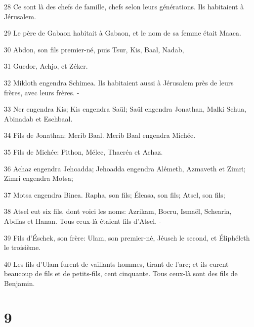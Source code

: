 \par 28 Ce sont là des chefs de famille, chefs selon leurs générations. Ils habitaient à Jérusalem.
\par 29 Le père de Gabaon habitait à Gabaon, et le nom de sa femme était Maaca.
\par 30 Abdon, son fils premier-né, puis Tsur, Kis, Baal, Nadab,
\par 31 Guedor, Achjo, et Zéker.
\par 32 Mikloth engendra Schimea. Ils habitaient aussi à Jérusalem près de leurs frères, avec leurs frères. -
\par 33 Ner engendra Kis; Kis engendra Saül; Saül engendra Jonathan, Malki Schua, Abinadab et Eschbaal.
\par 34 Fils de Jonathan: Merib Baal. Merib Baal engendra Michée.
\par 35 Fils de Michée: Pithon, Mélec, Thaeréa et Achaz.
\par 36 Achaz engendra Jehoadda; Jehoadda engendra Alémeth, Azmaveth et Zimri; Zimri engendra Motsa;
\par 37 Motsa engendra Binea. Rapha, son fils; Éleasa, son fils; Atsel, son fils;
\par 38 Atsel eut six fils, dont voici les noms: Azrikam, Bocru, Ismaël, Schearia, Abdias et Hanan. Tous ceux-là étaient fils d'Atsel. -
\par 39 Fils d'Éschek, son frère: Ulam, son premier-né, Jéusch le second, et Éliphéleth le troisième.
\par 40 Les fils d'Ulam furent de vaillants hommes, tirant de l'arc; et ils eurent beaucoup de fils et de petits-fils, cent cinquante. Tous ceux-là sont des fils de Benjamin.

\chapter{9}

